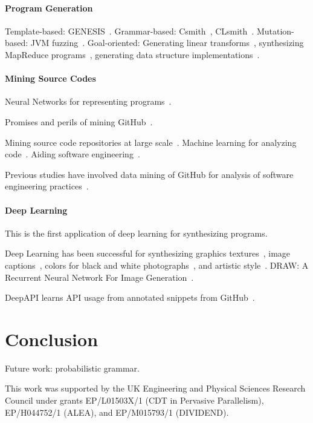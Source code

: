 \documentclass[preprint,nonatbib,10pt,nocopyrightspace]{sigplanconf}
\begin{document}
\paragraph{Program Generation} Template-based:
GENESIS~\cite{Chiu2015}.  Grammar-based: Csmith~\cite{Yang2012},
CLsmith~\cite{Pflanzer2016}. Mutation-based: JVM
fuzzing~\cite{Chena}. Goal-oriented: Generating linear
transforms~\cite{Voronenko2009}, synthesizing MapReduce
programs~\cite{Smith}, generating data structure
implementations~\cite{Loncaric2016}.


\paragraph{Mining Source Codes} Neural Networks for representing
programs~\cite{Bunel}.

Promises and perils of mining GitHub~\cite{Bird2009}.

Mining source code repositories at large
scale~\cite{Allamanis2013a,White2015a}. Machine learning for analyzing
code~\cite{Allamanis2014a,Raychev}. Aiding software
engineering~\cite{Allamanis2014,Bird2015}.

Previous studies have involved data mining of GitHub for analysis of
software engineering
practices~\cite{Wu2014,Guzman2014,Baishakhi2014a,Vasilescu2015}.


\paragraph{Deep Learning} This is the first application of deep
learning for synthesizing programs.

Deep Learning has been successful for synthesizing graphics
textures~\cite{Gatys2015a}, image captions~\cite{Vinyals}, colors for
black and white photographs~\cite{Zhang2016}, and artistic
style~\cite{Gatys2015}. DRAW: A Recurrent Neural Network For Image
Generation~\cite{Gregor2014}.


DeepAPI learns API usage from annotated snippets from
GitHub~\cite{Zhang2015a}.


\section{Conclusion}\label{sec:conclusion}

Future work: probabilistic grammar.


\acks

This work was supported by the UK Engineering and Physical Sciences
Research Council under grants EP/L01503X/1 (CDT in Pervasive
Parallelism), EP/H044752/1 (ALEA), and EP/M015793/1 (DIVIDEND).

\label{bibliography}
\printbibliography
\end{document}

